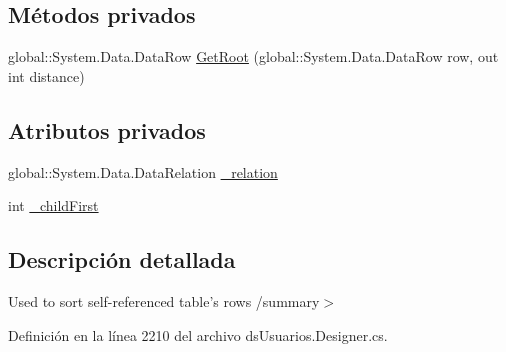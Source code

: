 \subsection*{Métodos privados}
\begin{DoxyCompactItemize}
\item 
global\-::\-System.\-Data.\-Data\-Row \hyperlink{class_proyecto___integrador__3_1_1ds_usuarios_table_adapters_1_1_table_adapter_manager_1_1_self_reference_comparer_adbe612a7a1ed56040974c39de179a041}{Get\-Root} (global\-::\-System.\-Data.\-Data\-Row row, out int distance)
\end{DoxyCompactItemize}
\subsection*{Atributos privados}
\begin{DoxyCompactItemize}
\item 
global\-::\-System.\-Data.\-Data\-Relation \hyperlink{class_proyecto___integrador__3_1_1ds_usuarios_table_adapters_1_1_table_adapter_manager_1_1_self_reference_comparer_aa94b2ca3f3ea52c71719c2b968ae574a}{\-\_\-relation}
\item 
int \hyperlink{class_proyecto___integrador__3_1_1ds_usuarios_table_adapters_1_1_table_adapter_manager_1_1_self_reference_comparer_a0d9b911f3c6ab73098107a9d88aa85c6}{\-\_\-child\-First}
\end{DoxyCompactItemize}


\subsection{Descripción detallada}
Used to sort self-\/referenced table's rows /summary$>$ 

Definición en la línea 2210 del archivo ds\-Usuarios.\-Designer.\-cs.



